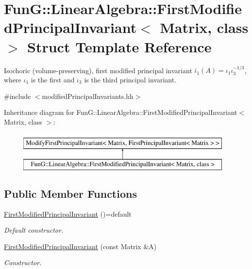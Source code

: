 \hypertarget{structFunG_1_1LinearAlgebra_1_1FirstModifiedPrincipalInvariant}{\section{Fun\-G\-:\-:Linear\-Algebra\-:\-:First\-Modified\-Principal\-Invariant$<$ Matrix, class $>$ Struct Template Reference}
\label{structFunG_1_1LinearAlgebra_1_1FirstModifiedPrincipalInvariant}
}


Isochoric (volume-\/preserving), first modified principal invariant $ \bar\iota_1(A)=\iota_1\iota_3^{-1/3} $, where $\iota_1$ is the first and $\iota_3$ is the third principal invariant.  




{\ttfamily \#include $<$modified\-Principal\-Invariants.\-hh$>$}

Inheritance diagram for Fun\-G\-:\-:Linear\-Algebra\-:\-:First\-Modified\-Principal\-Invariant$<$ Matrix, class $>$\-:\begin{figure}[H]
\begin{center}
\leavevmode
\includegraphics[height=2.000000cm]{structFunG_1_1LinearAlgebra_1_1FirstModifiedPrincipalInvariant}
\end{center}
\end{figure}
\subsection*{Public Member Functions}
\begin{DoxyCompactItemize}
\item 
\hypertarget{structFunG_1_1LinearAlgebra_1_1FirstModifiedPrincipalInvariant_ae7b7c7451b9c6e80f3c201539e171e7d}{\hyperlink{structFunG_1_1LinearAlgebra_1_1FirstModifiedPrincipalInvariant_ae7b7c7451b9c6e80f3c201539e171e7d}{First\-Modified\-Principal\-Invariant} ()=default}\label{structFunG_1_1LinearAlgebra_1_1FirstModifiedPrincipalInvariant_ae7b7c7451b9c6e80f3c201539e171e7d}

\begin{DoxyCompactList}\small\item\em Default constructor. \end{DoxyCompactList}\item 
\hyperlink{structFunG_1_1LinearAlgebra_1_1FirstModifiedPrincipalInvariant_aafdbc11f6d6022e7f6dd9d693d6f1d8e}{First\-Modified\-Principal\-Invariant} (const Matrix \&A)
\begin{DoxyCompactList}\small\item\em Constructor. \end{DoxyCompactList}\end{DoxyCompactItemize}



